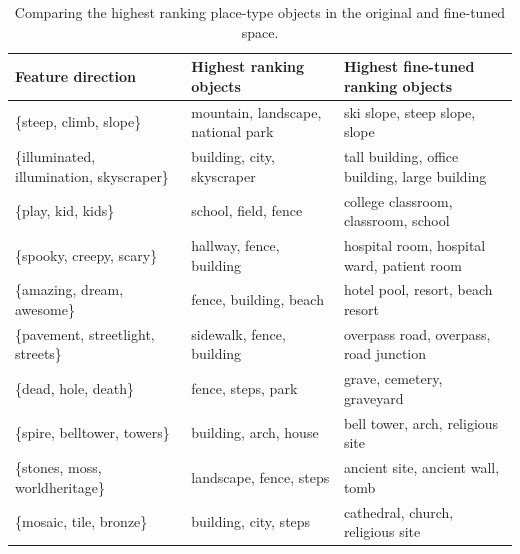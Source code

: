 \begin{table}[t]
	
	\centering
	\setlength{\tabcolsep}{8pt}
	\renewcommand{\arraystretch}{1.2}
	\footnotesize
	\begin{tabularx}{\textwidth}{l l l}
		\toprule
		\textbf{Feature direction} & Highest ranking objects & Highest fine-tuned ranking objects\\
		\midrule              
		\{steep, climb, slope\}                   & mountain, landscape, national park & ski slope, steep slope, slope                                     \\
		\{illuminated, illumination, skyscraper\} & building, city, skyscraper         & tall building, office building, large building                    \\
		\{play, kid, kids\}                       & school, field, fence               & college classroom, classroom, school                              \\
		\{spooky, creepy, scary\}          & hallway, fence, building             & hospital room, hospital ward, patient room                  \\
		\{amazing, dream, awesome\}                   & fence, building, beach    & hotel pool, resort, beach resort \\
		\{pavement, streetlight, streets\}        & sidewalk, fence, building          & overpass road, overpass, road junction                            \\
		\{dead, hole, death\}                     & fence, steps, park                 & grave, cemetery, graveyard                                        \\
		\{spire, belltower, towers\}              & building, arch, house              & bell tower, arch, religious site                                  \\
		\{stones, moss, worldheritage\}           & landscape, fence, steps            & ancient site, ancient wall, tomb                                  \\
		\{mosaic, tile, bronze\}                  & building, city, steps              & cathedral, church, religious site     \\
		\bottomrule
	\end{tabularx}
	
	\caption{Comparing the highest ranking place-type objects in the original and fine-tuned space. \label{tabTopRanked}}
\end{table}


